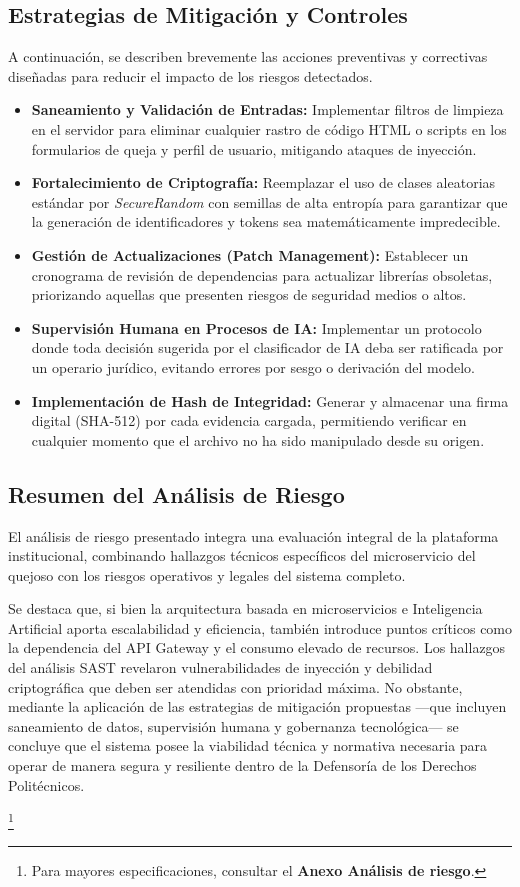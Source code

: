 \subsection{Estrategias de Mitigación y Controles}

A continuación, se describen brevemente las acciones preventivas y correctivas diseñadas para reducir el impacto de los riesgos detectados.

\begin{itemize}
    \item \textbf{Saneamiento y Validación de Entradas:} Implementar filtros de limpieza en el servidor para eliminar cualquier rastro de código HTML o scripts en los formularios de queja y perfil de usuario, mitigando ataques de inyección.
    \item \textbf{Fortalecimiento de Criptografía:} Reemplazar el uso de clases aleatorias estándar por \textit{SecureRandom} con semillas de alta entropía para garantizar que la generación de identificadores y tokens sea matemáticamente impredecible.
    \item \textbf{Gestión de Actualizaciones (Patch Management):} Establecer un cronograma de revisión de dependencias para actualizar librerías obsoletas, priorizando aquellas que presenten riesgos de seguridad medios o altos.
    \item \textbf{Supervisión Humana en Procesos de IA:} Implementar un protocolo donde toda decisión sugerida por el clasificador de IA deba ser ratificada por un operario jurídico, evitando errores por sesgo o derivación del modelo.
    \item \textbf{Implementación de Hash de Integridad:} Generar y almacenar una firma digital (SHA-512) por cada evidencia cargada, permitiendo verificar en cualquier momento que el archivo no ha sido manipulado desde su origen.
\end{itemize}

\subsection{Resumen del Análisis de Riesgo}

El análisis de riesgo presentado integra una evaluación integral de la plataforma institucional, combinando hallazgos técnicos específicos del microservicio del quejoso con los riesgos operativos y legales del sistema completo. 

Se destaca que, si bien la arquitectura basada en microservicios e Inteligencia Artificial aporta escalabilidad y eficiencia, también introduce puntos críticos como la dependencia del API Gateway y el consumo elevado de recursos. Los hallazgos del análisis SAST revelaron vulnerabilidades de inyección y debilidad criptográfica que deben ser atendidas con prioridad máxima. No obstante, mediante la aplicación de las estrategias de mitigación propuestas —que incluyen saneamiento de datos, supervisión humana y gobernanza tecnológica— se concluye que el sistema posee la viabilidad técnica y normativa necesaria para operar de manera segura y resiliente dentro de la Defensoría de los Derechos Politécnicos.

\footnote{Para mayores especificaciones, consultar el \textbf{Anexo Análisis de riesgo}.}
